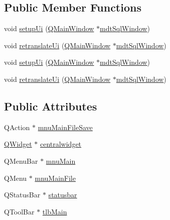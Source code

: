 \subsection*{Public Member Functions}
\begin{DoxyCompactItemize}
\item 
void \hyperlink{class_ui__mdt_sql_window_ae239e0a0f809a87b3e9ad72df5fec637}{setup\-Ui} (\hyperlink{class_q_main_window}{Q\-Main\-Window} $\ast$\hyperlink{classmdt_sql_window}{mdt\-Sql\-Window})
\item 
void \hyperlink{class_ui__mdt_sql_window_a20555e544c9d18d107ecf1a924c9ed90}{retranslate\-Ui} (\hyperlink{class_q_main_window}{Q\-Main\-Window} $\ast$\hyperlink{classmdt_sql_window}{mdt\-Sql\-Window})
\item 
void \hyperlink{class_ui__mdt_sql_window_ae239e0a0f809a87b3e9ad72df5fec637}{setup\-Ui} (\hyperlink{class_q_main_window}{Q\-Main\-Window} $\ast$\hyperlink{classmdt_sql_window}{mdt\-Sql\-Window})
\item 
void \hyperlink{class_ui__mdt_sql_window_a20555e544c9d18d107ecf1a924c9ed90}{retranslate\-Ui} (\hyperlink{class_q_main_window}{Q\-Main\-Window} $\ast$\hyperlink{classmdt_sql_window}{mdt\-Sql\-Window})
\end{DoxyCompactItemize}
\subsection*{Public Attributes}
\begin{DoxyCompactItemize}
\item 
Q\-Action $\ast$ \hyperlink{class_ui__mdt_sql_window_a58e6265c1ff8e257f024cd3dd1bf5e89}{mnu\-Main\-File\-Save}
\item 
\hyperlink{class_q_widget}{Q\-Widget} $\ast$ \hyperlink{class_ui__mdt_sql_window_ad4fe69de0e25edbc0b197f0bcf62632a}{centralwidget}
\item 
Q\-Menu\-Bar $\ast$ \hyperlink{class_ui__mdt_sql_window_a2cdcd27d2a4c021236a1d2adfa483cb5}{mnu\-Main}
\item 
Q\-Menu $\ast$ \hyperlink{class_ui__mdt_sql_window_aad9106c68c6839271df273119b5b74c8}{mnu\-Main\-File}
\item 
Q\-Status\-Bar $\ast$ \hyperlink{class_ui__mdt_sql_window_a48ad415bc7aa41b4d9a7386b6318ac7d}{statusbar}
\item 
Q\-Tool\-Bar $\ast$ \hyperlink{class_ui__mdt_sql_window_a7c4b51eb698a2d510ad52e5f86500ec2}{tlb\-Main}
\end{DoxyCompactItemize}


